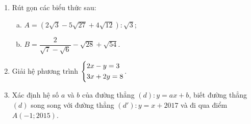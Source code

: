 \setcounter{ex}{0}
\begin{ex}%
\begin{enumerate}[1.]
\item Rút gọn các biểu thức sau:
	\begin{multicols}{2}
	\begin{enumerate}[a)]
	\item $A=\left(2\sqrt{3}-5\sqrt{27}+4\sqrt{12}\right):\sqrt{3}$;
	\item $B=\dfrac{2}{\sqrt{7}-\sqrt{6}}-\sqrt{28}+\sqrt{54}$.
	\end{enumerate}
	\end{multicols}
\item Giải hệ phương trình $\left\{\begin{aligned}&2x-y=3\\ &3x+2y=8\end{aligned}\right.$.
\item Xác định hệ số $a$ và $b$ của đường thẳng $(d):y=ax+b$, biết đường thẳng $(d)$ song song với đường thẳng $(d'): y=x+2017$ và đi qua điểm $A(-1;2015)$.
\end{enumerate}
\end{ex}

